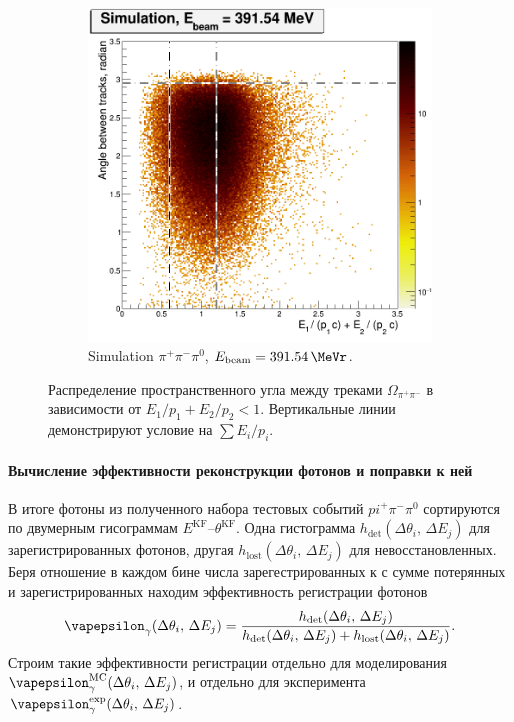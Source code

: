 \begin{figure}[htbp]
\begin{subfigure}[b]{0.45\textwidth}
        \includegraphics[width=\textwidth]{img/raskl_vs_sumEP_sim391_54.png}
        \caption{Simulation $\pi^+ \pi^- \pi^0$, $E_{\text{beam}} = \SI{391.54}{\MeVr}$.}
        \label{fig:3pi_raskl_sim391_54}
    \end{subfigure}
    \caption{Распределение пространственного угла между треками $\Omega_{\pi^+ \pi^-}$
    в зависимости от $E_1/p_1 + E_2 / p_2 < 1$.
    Вертикальные линии демонстрируют условие на $\sum E_i / p_i$.}\label{fig:3pi_raskl}
\end{figure}


\paragraph{Вычисление эффективности реконструкции фотонов и поправки к ней}

В итоге фотоны из полученного набора тестовых событий $pi^+ \pi^- \pi^0$
сортируются по двумерным гисограммам $E^{\text{KF}}$--$\theta^{\text{KF}}$.
Одна гистограмма $h_{\text{det}} ( \Delta \theta_i, \, \Delta E_j )$ для зарегистрированных фотонов,
другая $h_{\text{lost}} ( \Delta \theta_i, \, \Delta E_j )$ для невосстановленных.
Беря отношение в каждом бине числа зарегестрированных к с сумме потерянных и зарегистрированных
находим эффективность регистрации фотонов
\begin{equation}
	\vapepsilon_{\gamma} ( \Delta \theta_i, \, \Delta E_j ) =
	\frac{h_{\text{det}} ( \Delta \theta_i, \, \Delta E_j )
	}{
	h_{\text{det}} ( \Delta \theta_i, \, \Delta E_j ) + h_{\text{lost}} ( \Delta \theta_i, \, \Delta E_j )
	} .
\end{equation}
Строим такие эффективности регистрации отдельно для моделирования
$\vapepsilon_{\gamma}^{\text{MC}} ( \Delta \theta_i, \, \Delta E_j )$,
и отдельно для эксперимента
$\vapepsilon_{\gamma}^{\text{exp}} ( \Delta \theta_i, \, \Delta E_j )$.


